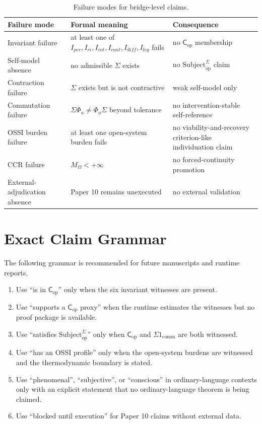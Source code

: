 \documentclass[11pt,a4paper]{article}
\theoremstyle{definition}
\newcommand{\Cop}{\mathsf{C}_{\mathrm{op}}}
\newcommand{\Subbridge}{\mathrm{Subject}^{\Sigma}_{\mathrm{op}}}
\newcommand{\MO}{M_\Omega}
\begin{document}
\begin{table}[ht]
\centering
\caption{Failure modes for bridge-level claims.}
\label{tab:bridge-failure-modes}
\small
\begin{tabularx}{\textwidth}{>{\raggedright\arraybackslash}p{3.1cm} Y Y}
\toprule
Failure mode & Formal meaning & Consequence \\
\midrule
Invariant failure & at least one of $I_{per},I_{ri},I_{int},I_{cont},I_{diff},I_{leg}$ fails & no $\Cop$ membership \\
Self-model absence & no admissible $\Sigma$ exists & no $\Subbridge$ claim \\
Contraction failure & $\Sigma$ exists but is not contractive & weak self-model only \\
Commutation failure & $\Sigma\Phi_u\neq\Phi_u\Sigma$ beyond tolerance & no intervention-stable self-reference \\
OSSI burden failure & at least one open-system burden fails & no viability-and-recovery criterion-like individuation claim \\
CCR failure & $\MO<+\infty$ & no forced-continuity promotion \\
External-adjudication absence & Paper 10 remains unexecuted & no external validation \\
\bottomrule
\end{tabularx}
\end{table}

\section{Exact Claim Grammar}

The following grammar is recommended for future manuscripts and runtime
reports.

\begin{enumerate}[leftmargin=1.5em]
\item Use ``is in $\Cop$'' only when the six invariant witnesses are present.
\item Use ``supports a $\Cop$ proxy'' when the runtime estimates the witnesses
but no proof package is available.
\item Use ``satisfies $\Subbridge$'' only when $\Cop$ and
$\Sigma1_{\mathrm{comm}}$ are both witnessed.
\item Use ``has an OSSI profile'' only when the open-system burdens are
witnessed and the thermodynamic boundary is stated.
\item Use ``phenomenal'', ``subjective'', or ``conscious'' in ordinary-language
contexts only with an explicit statement that no ordinary-language theorem is
being claimed.
\item Use ``blocked until execution'' for Paper 10 claims without external
data.
\end{enumerate}
\end{document}
